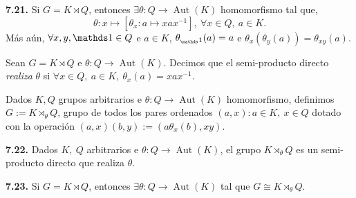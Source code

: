 \hypertarget{lemma721}{}
\begin{lemma}
    \textbf{7.21.} Si \(G= K\rtimes Q\), entonces \(\exists \theta : Q \to \operatorname{Aut}(K)\) homomorfismo tal que, 
    \[ \theta : x \mapsto [\theta_x : a \mapsto xax^{-1}], \ \forall x \in Q, \ a \in K.\] 
    Más aún, \(\forall x, y, \id \in Q\) e \(a \in K\), \(\theta_{_\id} (a) = a\) e \(\theta_x(\theta_y(a)) = \theta_{xy}(a)\). 
\end{lemma}

\begin{definition}
    Sean \(G = K \rtimes Q\) e \(\theta : Q \to \operatorname{Aut}(K)\). Decimos que el semi-producto directo \emph{realiza} \(\theta \) si \(\forall x \in Q,\ a \in K, \ \theta_x(a) = xax^{-1}\). 
\end{definition}

\begin{definition}
    Dados \(K, Q\) grupos arbitrarios e \(\theta: Q \to \operatorname{Aut}(K)\) homomorfismo, definimos \(G := K \rtimes_\theta Q \), grupo de todos los pares ordenados \((a,x) : a \in K, \ x\in Q\) dotado con la operación \((a,x)(b,y) := (a\theta_x(b), xy)\).  
\end{definition}

\begin{theorem}
    \textbf{7.22.} Dados \(K,\ Q \) arbitrarios e \(\theta : Q \to \operatorname{Aut}(K)\), el grupo \(K\rtimes_\theta Q\) es un semi-producto directo que realiza \(\theta\). 
\end{theorem}

\begin{theorem}
    \textbf{7.23.} Si \(G = K \rtimes Q\), entonces \(\exists \theta : Q \to \operatorname{Aut}(K) \) tal que \( G \cong K \rtimes_\theta Q\). 
\end{theorem}

